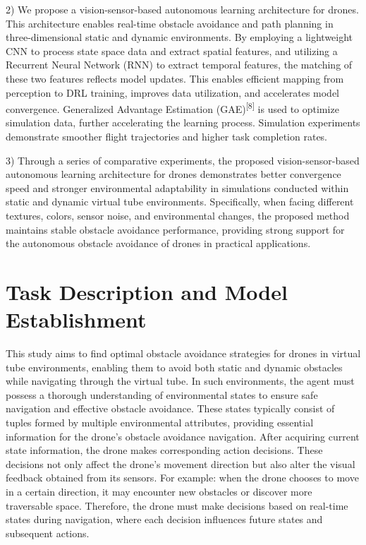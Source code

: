 \documentclass{aas}
\begin{document}
2)  We propose a vision-sensor-based autonomous learning architecture for drones. This architecture enables real-time obstacle avoidance and path planning in three-dimensional static and dynamic environments. By employing a lightweight CNN to process state space data and extract spatial features, and utilizing a Recurrent Neural Network (RNN) to extract temporal features, the matching of these two features reflects model updates. This enables efficient mapping from perception to DRL training, improves data utilization, and accelerates model convergence. Generalized Advantage Estimation (GAE)\textsuperscript{[8]} is used to optimize simulation data, further accelerating the learning process. Simulation experiments demonstrate smoother flight trajectories and higher task completion rates.

3)  Through a series of comparative experiments, the proposed vision-sensor-based autonomous learning architecture for drones demonstrates better convergence speed and stronger environmental adaptability in simulations conducted within static and dynamic virtual tube environments. Specifically, when facing different textures, colors, sensor noise, and environmental changes, the proposed method maintains stable obstacle avoidance performance, providing strong support for the autonomous obstacle avoidance of drones in practical applications.
\pagestyle{aasheadings}



\section{Task Description and Model Establishment}
This study aims to find optimal obstacle avoidance strategies for drones in virtual tube environments, enabling them to avoid both static and dynamic obstacles while navigating through the virtual tube. In such environments, the agent must possess a thorough understanding of environmental states to ensure safe navigation and effective obstacle avoidance. These states typically consist of tuples formed by multiple environmental attributes, providing essential information for the drone's obstacle avoidance navigation. After acquiring current state information, the drone makes corresponding action decisions. These decisions not only affect the drone's movement direction but also alter the visual feedback obtained from its sensors. For example: when the drone chooses to move in a certain direction, it may encounter new obstacles or discover more traversable space. Therefore, the drone must make decisions based on real-time states during navigation, where each decision influences future states and subsequent actions.
\end{document}
